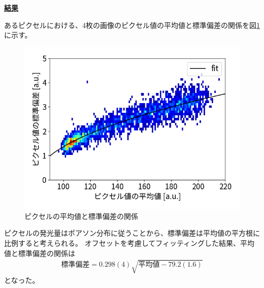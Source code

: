 \documentclass[a4paper,11pt,uplatex]{jsbook}
\begin{document}
\noindent \textbf{\underline{結果}}\par
あるピクセルにおける、4枚の画像のピクセル値の平均値と標準偏差の関係を図\ref{pixel}に示す。
\begin{figure}[h]
  \centering
  \includegraphics[width=0.8\linewidth]{image/4-pixel.png}
  \caption{ピクセルの平均値と標準偏差の関係}\label{pixel}
\end{figure}
ピクセルの発光量はポアソン分布に従うことから、標準偏差は平均値の平方根に比例すると考えられる。
オフセットを考慮してフィッティングした結果、平均値と標準偏差の関係は
\begin{eqnarray}
  \text{標準偏差} = 0.298(4) \sqrt{\text{平均値} - 79.2(1.6) } 
\end{eqnarray}
となった。
\end{document}
